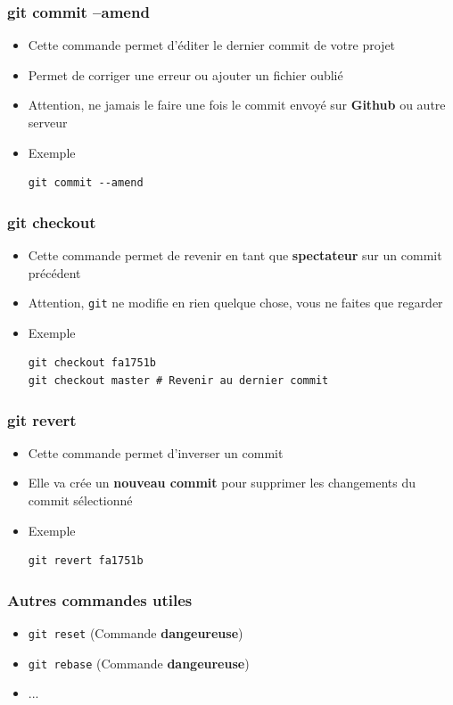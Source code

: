 \documentclass{beamer}
\begin{document}
\begin{frame}[fragile]
\frametitle{git commit --amend}

\begin{itemize}
\item Cette commande permet d'éditer le dernier commit de votre projet
\item Permet de corriger une erreur ou ajouter un fichier oublié
\item Attention, ne jamais le faire une fois le commit envoyé sur \textbf{Github} ou autre serveur
\item Exemple
\begin{lstlisting}
git commit --amend
\end{lstlisting}
\end{itemize}
\end{frame}

\begin{frame}[fragile]
\frametitle{git checkout}

\begin{itemize}
\item Cette commande permet de revenir en tant que \textbf{spectateur} sur un commit précédent
\item Attention, \texttt{git} ne modifie en rien quelque chose, vous ne faites que regarder
\item Exemple
\begin{lstlisting}
git checkout fa1751b
git checkout master # Revenir au dernier commit
\end{lstlisting}
\end{itemize}
\end{frame}

\begin{frame}[fragile]
\frametitle{git revert}

\begin{itemize}
\item Cette commande permet d'inverser un commit
\item Elle va crée un \textbf{nouveau commit} pour supprimer les changements du commit sélectionné
\item Exemple
\begin{lstlisting}
git revert fa1751b
\end{lstlisting}
\end{itemize}
\end{frame}

\begin{frame}[fragile]
\frametitle{Autres commandes utiles}

\begin{itemize}
\item \lstinline{git reset} (Commande \textbf{dangeureuse})
\item \lstinline{git rebase} (Commande \textbf{dangeureuse})
\item ...
\end{itemize}
\end{frame}
\end{document}
